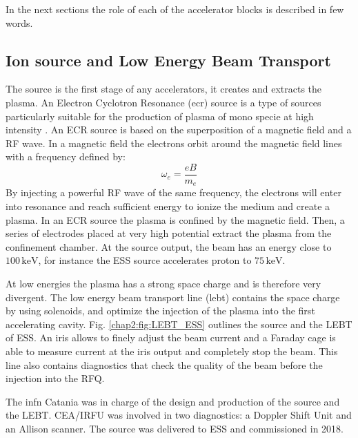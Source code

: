 \begin{refsection}
  

  In the next sections the role of each of the accelerator blocks is described in few words.

  \subsection{Ion source and Low Energy Beam Transport}
  The source is the first stage of any accelerators, it creates and extracts the plasma. An Electron Cyclotron Resonance (\acrshort{ecr}) source is a type of sources particularly suitable for the production of plasma of mono specie at high intensity \cite{nicke2012}. An ECR source is based on the superposition of a magnetic field and a RF wave. In a magnetic field the electrons orbit around the magnetic field lines with a frequency defined by:
  \begin{equation}
    \omega_{e} = \frac{eB}{m_{e}}
  \end{equation}
  By injecting a powerful RF wave of the same frequency, the electrons will enter into resonance and reach sufficient energy to ionize the medium and create a plasma. In an ECR source the plasma is confined by the magnetic field. Then, a series of electrodes placed at very high potential extract the plasma from the confinement chamber. At the source output, the beam has an energy close to $100\,\mathrm{keV}$, for instance the ESS source accelerates
  proton to $75\,\mathrm{keV}$.

  At low energies the plasma has a strong space charge and is therefore very divergent. The low energy beam transport line (\acrshort{lebt}) contains the space charge by using solenoids, and optimize the injection of the plasma into the first accelerating cavity.
  Fig. \ref{chap2:fig:LEBT_ESS} outlines the source and the LEBT of ESS. An iris allows to finely adjust the beam current and a Faraday cage is able to measure current at the iris output and completely stop the beam. This line also contains diagnostics that check the quality of the beam before the injection into the RFQ.

  The \acrshort{infn} Catania was in charge of the design and production of the source and the LEBT. CEA/IRFU was involved in two diagnostics: a Doppler Shift Unit \cite{Thomas:IPAC2017-MOPVA037} and an Allison scanner\cite{Tuske:IPAC2017-MOPAB023}. The source was delivered to ESS and commissioned in 2018.

  


\end{refsection}
